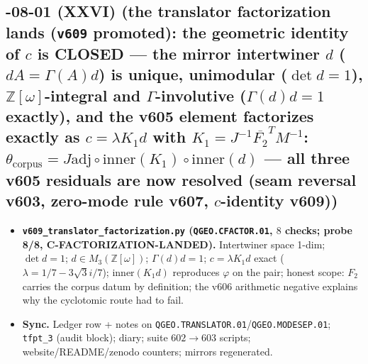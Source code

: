 \documentclass[11pt]{article}
\begin{document}
\subsection*{-08-01 (XXVI) (the translator factorization lands (\texttt{v609} promoted): the geometric identity of $c$ is CLOSED --- the mirror intertwiner $d$ ($dA=\Gamma(A)d$) is unique, unimodular ($\det d=1$), $\mathbb{Z}[\omega]$-integral and $\Gamma$-involutive ($\Gamma(d)d=1$ exactly), and the v605 element factorizes exactly as $c=\lambda K_1d$ with $K_1=J^{-1}\overline{F_2}^TM^{-1}$: $\theta_{\mathrm{corpus}}=J\mathrm{adj}\circ\mathrm{inner}(K_1)\circ\mathrm{inner}(d)$ --- all three v605 residuals are now resolved (seam reversal v603, zero-mode rule v607, $c$-identity v609))}
\begin{itemize}[leftmargin=1.5em]
\item \textbf{\texttt{v609\_translator\_factorization.py} (\texttt{QGEO.CFACTOR.01}, $8$ checks;
probe 8/8, C-FACTORIZATION-LANDED).} Intertwiner space 1-dim; $\det d=1$;
$d\in M_3(\mathbb{Z}[\omega])$; $\Gamma(d)d=1$; $c=\lambda K_1d$ exact
($\lambda=1/7-3\sqrt3 i/7$); $\mathrm{inner}(K_1d)$ reproduces $\varphi$ on the pair;
honest scope: $F_2$ carries the corpus datum by definition; the v606 arithmetic negative
explains why the cyclotomic route had to fail.
\item \textbf{Sync.} Ledger row + notes on
\texttt{QGEO.TRANSLATOR.01}/\texttt{QGEO.MODESEP.01}; \texttt{tfpt\_3} (audit block); diary;
suite $602\to603$ scripts; website/README/zenodo counters; mirrors regenerated.
\end{itemize}
\end{document}
